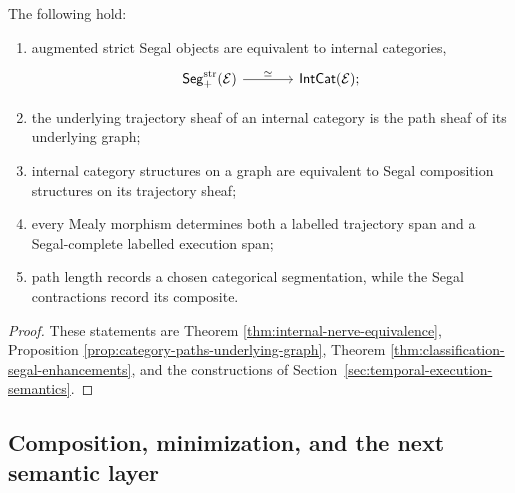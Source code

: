 \begin{theorem}
\label{thm:segal-execution-summary}
The following hold:
\begin{enumerate}
    \item augmented strict Segal objects are equivalent to internal categories,
    \[
    \begin{tikzcd}[column sep=large]
        \mathsf{Seg}^{\mathrm{str}}_+(\mathcal E)
            \arrow[r, "\simeq"]
        &
        \mathsf{IntCat}(\mathcal E);
    \end{tikzcd}
    \]
    \item the underlying trajectory sheaf of an internal category is the path
    sheaf of its underlying graph;
    \item internal category structures on a graph are equivalent to Segal
    composition structures on its trajectory sheaf;
    \item every Mealy morphism determines both a labelled trajectory span and
    a Segal-complete labelled execution span;
    \item path length records a chosen categorical segmentation, while the
    Segal contractions record its composite.
\end{enumerate}
\end{theorem}

\begin{proof}
These statements are Theorem
\ref{thm:internal-nerve-equivalence}, Proposition
\ref{prop:category-paths-underlying-graph}, Theorem
\ref{thm:classification-segal-enhancements}, and the constructions of
Section~\ref{sec:temporal-execution-semantics}.
\end{proof}

\subsection{Composition, minimization, and the next semantic layer}
\label{subsec:temporal-semantics-minimization-summary}

